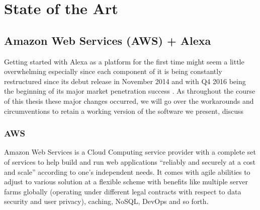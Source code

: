 





\section{State of the Art}


\subsection*{Amazon Web Services (AWS) + Alexa}


Getting started with Alexa as a platform for the first time might seem a little overwhelming especially since each component of it is being  constantly restructured since its debut release in November 2014 and with Q4 2016 being the beginning of its major market penetration success \cite{gartnerpreds17}. %
As throughout the course of this thesis these major changes occurred, %
 we will go over the workarounds and circumventions to retain a working version of the software we present, discuss

\subsubsection*{AWS}
Amazon Web Services is a Cloud Computing service provider with a complete set of services to help build and run web applications ``reliably and securely at a cost and scale'' according to one's independent needs. \cite{aws_website}
It comes with agile abilities to adjust to various solution at a flexible scheme with benefits like multiple server farms globally (operating under different legal contracts with respect to data security and user privacy), caching, NoSQL, DevOps and so forth.


